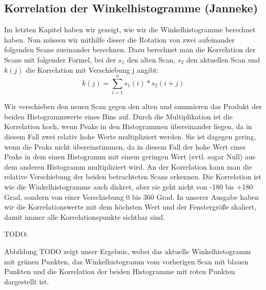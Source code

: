 \subsection{Korrelation der Winkelhistogramme (Janneke)}

Im letzten Kapitel haben wir gezeigt, wie wir die Winkelhistogramme berechnet haben. Nun müssen wir mithilfe dieser die Rotation von zwei aufeinander folgenden Scans zueinander berechnen. Dazu berechnet man die Korrelation der Scans mit folgender Formel, bei der $s_1$ den alten Scan, $s_2$ den aktuellen Scan und $k(j)$ die Korrelation mit Verschiebung j angibt:
$$k(j) = \sum_{i = 1}^{n} s_1(i)*s_2(i+j)$$

Wir verschieben den neuen Scan gegen den alten und summieren das Produkt der beiden Histogrammwerte eines Bins auf. Durch die Multiplikation ist die Korrelation hoch, wenn Peaks in den Histogrammen übereinander liegen, da in diesem Fall zwei relativ hohe Werte multipliziert werden. Sie ist dagegen gering, wenn die Peaks nicht übereinstimmen, da in diesem Fall der hohe Wert eines Peaks in dem einen Histogramm mit einem geringen Wert (evtl. sogar Null) aus dem anderen Histogramm multipliziert wird. An der Korrelation kann man die relative Verschiebung der beiden betrachteten Scans erkennen. Die Korrelation ist wie die Winkelhistogramme auch diskret, aber sie geht nicht von -180 bis +180 Grad, sondern von einer Verschiebung 0 bis 360 Grad. In unserer Ausgabe haben wir die Korrelationswerte mit dem höchsten Wert und der Fenstergröße skaliert, damit immer alle Korrelationspunkte sichtbar sind.

TODO:

Abbildung TODO %
zeigt unser Ergebnis, wobei das aktuelle Winkelhistogramm mit grünen Punkten, das Winkelhistogramm vom vorherigen Scan mit blauen Punkten und die Korrelation der beiden Histogramme mit roten Punkten dargestellt ist.